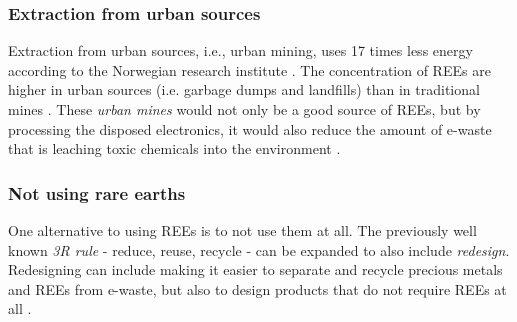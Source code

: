 \subsubsection{Extraction from urban sources}

Extraction from urban sources, i.e., urban mining, uses 17 times less energy according to the Norwegian research institute \cite{javed2024}. The concentration of REEs are higher in urban sources (i.e. garbage dumps and landfills) than in traditional mines \cite{javed2024}. These \textit{urban mines} would not only be a good source of REEs, but by processing the disposed electronics, it would also reduce the amount of e-waste that is leaching toxic chemicals into the environment \cite{javed2024}.

\subsubsection{Not using rare earths}

One alternative to using REEs is to not use them at all. The previously well known \textit{3R rule} - reduce, reuse, recycle - can be expanded to also include \textit{redesign}. Redesigning can include making it easier to separate and recycle precious metals and REEs from e-waste, but also to design products that do not require REEs at all \cite{motorNoREE}.


